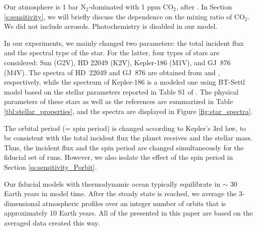 \documentclass[11pt,numberedappendix,twocolappendix,]{emulateapj}
\begin{document}
Our atmosphere is 1 bar N$_2$-dominated with 1 ppm CO$_2$, after  \citet{Kopparapu2016}. 
In Section \ref{s:sensitivity}, we will briefly discuss the dependence on the mixing ratio of CO$_2$. 
We did not include aerosols. 
Photochemistry is disabled in our model. 


In our experiments, we mainly changed two parameters: the total incident flux  and the spectral type of the star. 
For the latter, four types of stars are considered: 
Sun (G2V), 
HD 22049 (K2V), 
Kepler-186 (M1V), and 
GJ~876 (M4V). 
The spectra of HD~22049 and GJ~876 are obtained from \citet{Segura2003} and \citet{Domagal-Goldman2014}, respectively, 
while the spectrum of Kepler-186 is a modeled one using BT-Settl model \citep{Allard2012} based on the stellar parameters reported in Table S1 of \citet{Quintana2014}. 
The physical parameters of these stars as well as the references are summarized in Table \ref{tbl:stellar_properties}, and the spectra are displayed in Figure \ref{fig:star_spectra}. 

The orbital period (= spin period) is changed according to Kepler's 3rd law, to be consistent with the total incident flux the planet receives and the stellar mass. Thus, the incident flux and the spin period are changed simultaneously for the fiducial set of runs. 
However, we also isolate the effect of the spin period in Section \ref{ss:sensitivity_Porbit}. 

Our fiducial models with thermodynamic ocean typically equilibrate in  $\sim $ 30 Earth years in model time. 
After the steady state is reached, we average the 3-dimensional atmospheric profiles over an integer number of orbits that is approximately 10 Earth years. 
All of the presented in this paper are based on the averaged data created this way. 
\end{document}
